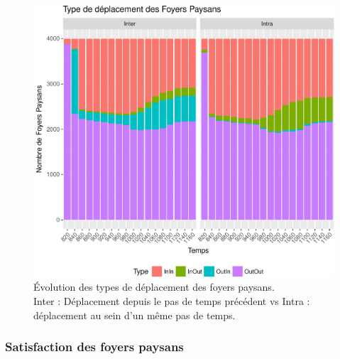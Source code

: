 \begin{figure}[H]
\captionsetup{width=\linewidth}
\includegraphics[width=\linewidth]{img/resultats/v0_types_deplacements.pdf}
\caption{Évolution des types de déplacement des foyers paysans.\\
Inter : Déplacement depuis le pas de temps précédent vs Intra :
déplacement au sein d'un même pas de temps.
\\
} 
\label{fig:type-deplacements-v0} 
\end{figure}

\clearpage

\subsubsection{Satisfaction des foyers paysans}

